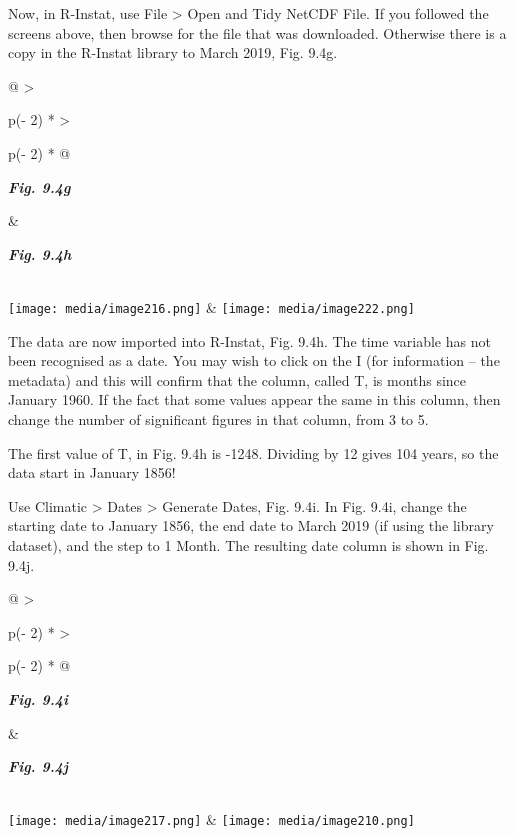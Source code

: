 \documentclass[
  letterpaper,
  DIV=11,
  numbers=noendperiod]{scrreprt}
\begin{document}
Now, in R-Instat, use File \textgreater{} Open and Tidy NetCDF File. If
you followed the screens above, then browse for the file that was
downloaded. Otherwise there is a copy in the R-Instat library to March
2019, Fig. 9.4g.

\begin{longtable}[]{@{}
  >{\raggedright\arraybackslash}p{(\columnwidth - 2\tabcolsep) * }
  >{\raggedright\arraybackslash}p{(\columnwidth - 2\tabcolsep) * }@{}}
\toprule\noalign{}
\begin{minipage}[b]{\linewidth}\raggedright
\textbf{\emph{Fig. 9.4g}}
\end{minipage} & \begin{minipage}[b]{\linewidth}\raggedright
\textbf{\emph{Fig. 9.4h}}
\end{minipage} \\
\midrule\noalign{}
\endhead
\bottomrule\noalign{}
\endlastfoot
\texttt{[image: media/image216.png]} &
\texttt{[image: media/image222.png]} \\
\end{longtable}

The data are now imported into R-Instat, Fig. 9.4h. The time variable
has not been recognised as a date. You may wish to click on the I (for
information -- the metadata) and this will confirm that the column,
called T, is months since January 1960. If the fact that some values
appear the same in this column, then change the number of significant
figures in that column, from 3 to 5.

The first value of T, in Fig. 9.4h is -1248. Dividing by 12 gives 104
years, so the data start in January 1856!

Use Climatic \textgreater{} Dates \textgreater{} Generate Dates, Fig.
9.4i. In Fig. 9.4i, change the starting date to January 1856, the end
date to March 2019 (if using the library dataset), and the step to 1
Month. The resulting date column is shown in Fig. 9.4j.

\begin{longtable}[]{@{}
  >{\raggedright\arraybackslash}p{(\columnwidth - 2\tabcolsep) * }
  >{\raggedright\arraybackslash}p{(\columnwidth - 2\tabcolsep) * }@{}}
\toprule\noalign{}
\begin{minipage}[b]{\linewidth}\raggedright
\textbf{\emph{Fig. 9.4i}}
\end{minipage} & \begin{minipage}[b]{\linewidth}\raggedright
\textbf{\emph{Fig. 9.4j}}
\end{minipage} \\
\midrule\noalign{}
\endhead
\bottomrule\noalign{}
\endlastfoot
\texttt{[image: media/image217.png]} &
\texttt{[image: media/image210.png]} \\
\end{longtable}
\end{document}
